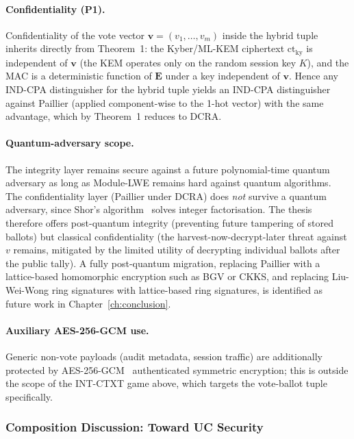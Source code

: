 \paragraph{Confidentiality (P1).} Confidentiality of the vote vector $\mathbf{v} = (v_1, \ldots, v_m)$ inside the hybrid tuple inherits directly from Theorem~1: the Kyber/ML-KEM ciphertext $\text{ct}_{\text{ky}}$ is independent of $\mathbf{v}$ (the KEM operates only on the random session key $K$), and the MAC is a deterministic function of $\mathbf{E}$ under a key independent of $\mathbf{v}$. Hence any IND-CPA distinguisher for the hybrid tuple yields an IND-CPA distinguisher against Paillier (applied component-wise to the 1-hot vector) with the same advantage, which by Theorem~1 reduces to DCRA.

\paragraph{Quantum-adversary scope.} The integrity layer remains secure against a future polynomial-time quantum adversary as long as Module-LWE remains hard against quantum algorithms. The confidentiality layer (Paillier under DCRA) does \emph{not} survive a quantum adversary, since Shor's algorithm~\cite{shor1997} solves integer factorisation. The thesis therefore offers post-quantum integrity (preventing future tampering of stored ballots) but classical confidentiality (the harvest-now-decrypt-later threat against $v$ remains, mitigated by the limited utility of decrypting individual ballots after the public tally). A fully post-quantum migration, replacing Paillier with a lattice-based homomorphic encryption such as BGV or CKKS, and replacing Liu-Wei-Wong ring signatures with lattice-based ring signatures, is identified as future work in Chapter~\ref{ch:conclusion}.

\paragraph{Auxiliary AES-256-GCM use.} Generic non-vote payloads (audit metadata, session traffic) are additionally protected by AES-256-GCM~\cite{nist_gcm} authenticated symmetric encryption; this is outside the scope of the INT-CTXT game above, which targets the vote-ballot tuple specifically.

\subsubsection{Composition Discussion: Toward UC Security}
\label{subsubsec:uc-composition}

